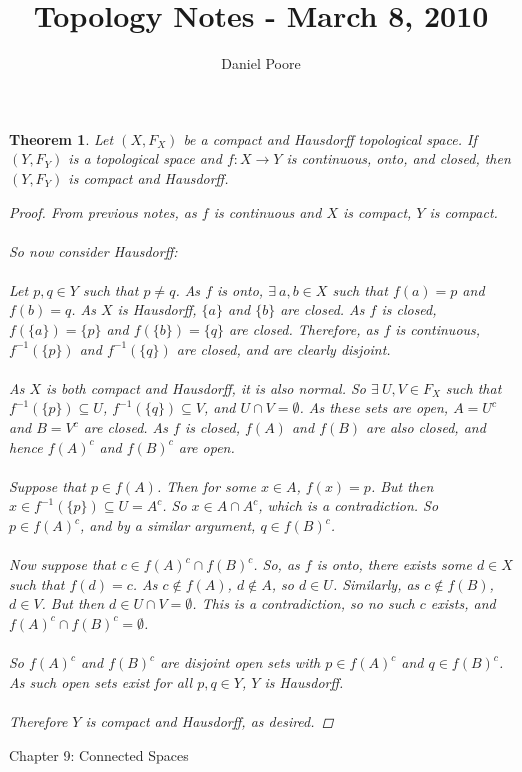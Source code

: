 \documentclass[11pt]{article}
\title{Topology Notes - March 8, 2010}
\author{Daniel Poore}
\date{}                                           %
\newtheorem{theorem}{Theorem}
\begin{document}
\maketitle

\begin{theorem}
Let $(X,F_X)$ be a compact and Hausdorff topological space.  If $(Y,F_Y)$ is a topological space and $f : X \to Y$ is continuous, onto, and closed, then $(Y,F_Y)$ is compact and Hausdorff.
\begin{proof}
From previous notes, as $f$ is continuous and $X$ is compact, $Y$ is compact.
\\
\\
So now consider Hausdorff:
\\
\\
Let $p,q \in Y$ such that $p \neq q$.  As $f$ is onto, $\exists \ a,b \in X$ such that $f(a) = p$ and $f(b) = q$.  As $X$ is Hausdorff, $\{a\}$ and $\{b\}$ are closed.  As $f$ is closed, $f(\{a\}) = \{p\}$ and $f(\{b\}) = \{q\}$ are closed.  Therefore, as $f$ is continuous, $f^{-1}(\{p\})$ and $f^{-1}(\{q\})$ are closed, and are clearly disjoint.
\\
\\
As $X$ is both compact and Hausdorff, it is also normal.  So $\exists \ U,V \in F_X$ such that $f^{-1}(\{p\}) \subseteq U$, $f^{-1}(\{q\}) \subseteq V$, and $U \cap V = \emptyset$.  As these sets are open, $A = U^c$ and $B = V^c$ are closed.  As $f$ is closed, $f(A)$ and $f(B)$ are also closed, and hence $f(A)^c$ and $f(B)^c$ are open.
\\
\\
Suppose that $p \in f(A)$.  Then for some $x \in A$, $f(x) = p$.  But then $x \in f^{-1}(\{p\}) \subseteq U = A^c$.  So $x \in A \cap A^c$, which is a contradiction.  So $p \in f(A)^c$, and by a similar argument, $q \in f(B)^c$.
\\
\\
Now suppose that $c \in f(A)^c \cap f(B)^c$.  So, as $f$ is onto, there exists some $d \in X$ such that $f(d) = c$.  As $c \notin f(A)$, $d \notin A$, so $d \in U$.  Similarly, as $c \notin f(B)$, $d \in V$.  But then $d \in U \cap V = \emptyset$.  This is a contradiction, so no such $c$ exists, and $f(A)^c \cap f(B)^c = \emptyset$.
\\
\\
So $f(A)^c$ and $f(B)^c$ are disjoint open sets with $p \in f(A)^c$ and $q \in f(B)^c$.  As such open sets exist for all $p,q \in Y$, $Y$ is Hausdorff.
\\
\\
Therefore $Y$ is compact and Hausdorff, as desired.
\end{proof}
\end{theorem}
\newpage
\begin{center}
\Large{Chapter 9: Connected Spaces}
\end{center}
\end{document}
